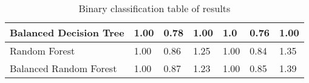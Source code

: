 \begin{table}
{\begin{tabular}{l|lll|lll|}
  \multicolumn{1}{|l|}{Balanced Decision Tree}       & \multicolumn{1}{l|}{1.00}                & \multicolumn{1}{l|}{0.78}  & 1.00                                  & \multicolumn{1}{l|}{1.0}                & \multicolumn{1}{l|}{0.76} & 1.00                                  \\ \hline
  \multicolumn{1}{|l|}{Random Forest}                & \multicolumn{1}{l|}{1.00}                & \multicolumn{1}{l|}{0.86} & 1.25                   & \multicolumn{1}{l|}{1.00}                & \multicolumn{1}{l|}{0.84} & 1.35                   \\ \hline
  \multicolumn{1}{|l|}{Balanced Random Forest}       & \multicolumn{1}{l|}{1.00} & \multicolumn{1}{l|}{0.87} & 1.23                   & \multicolumn{1}{l|}{1.00}                & \multicolumn{1}{l|}{0.85} & 1.39                    \\ \hline
  \end{tabular}
}
\caption{Binary classification table of results}
\label{tab:binary}
\end{table}


